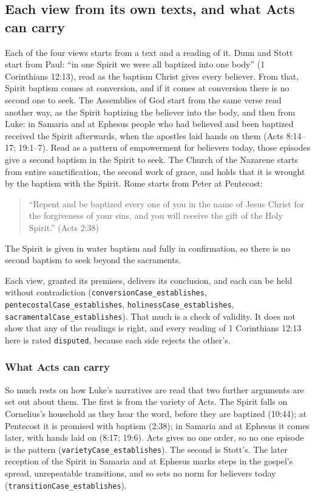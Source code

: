 \documentclass[11pt]{article}
\begin{document}
\subsection*{Each view from its own texts, and what Acts can carry}
Each of the four views starts from a text and a reading of it. Dunn and Stott start from Paul: “in one Spirit we were all baptized into one body” (1 Corinthians 12:13), read as the baptism Christ gives every believer. From that, Spirit baptism comes at conversion, and if it comes at conversion there is no second one to seek. The Assemblies of God start from the same verse read another way, as the Spirit baptizing the believer into the body, and then from Luke: in Samaria and at Ephesus people who had believed and been baptized received the Spirit afterwards, when the apostles laid hands on them (Acts 8:14–17; 19:1–7). Read as a pattern of empowerment for believers today, those episodes give a second baptism in the Spirit to seek. The Church of the Nazarene starts from entire sanctification, the second work of grace, and holds that it is wrought by the baptism with the Spirit. Rome starts from Peter at Pentecost:

\begin{quote}
“Repent and be baptized every one of you in the name of Jesus Christ for the forgiveness of your sins, and you will receive the gift of the Holy Spirit.” (Acts 2:38)

\end{quote}
The Spirit is given in water baptism and fully in confirmation, so there is no second baptism to seek beyond the sacraments.

Each view, granted its premises, delivers its conclusion, and each can be held without contradiction (\texttt{conversion\allowbreak{}Case\_\allowbreak{}establishes}, \texttt{pentecostal\allowbreak{}Case\_\allowbreak{}establishes}, \texttt{holiness\allowbreak{}Case\_\allowbreak{}establishes}, \texttt{sacramental\allowbreak{}Case\_\allowbreak{}establishes}). That much is a check of validity. It does not show that any of the readings is right, and every reading of 1 Corinthians 12:13 here is rated \texttt{disputed}, because each side rejects the other’s.

\subsubsection*{What Acts can carry}
So much rests on how Luke’s narratives are read that two further arguments are set out about them. The first is from the variety of Acts. The Spirit falls on Cornelius’s household as they hear the word, before they are baptized (10:44); at Pentecost it is promised with baptism (2:38); in Samaria and at Ephesus it comes later, with hands laid on (8:17; 19:6). Acts gives no one order, so no one episode is the pattern (\texttt{variety\allowbreak{}Case\_\allowbreak{}establishes}). The second is Stott’s. The later reception of the Spirit in Samaria and at Ephesus marks steps in the gospel’s spread, unrepeatable transitions, and so sets no norm for believers today (\texttt{transition\allowbreak{}Case\_\allowbreak{}establishes}).
\end{document}
